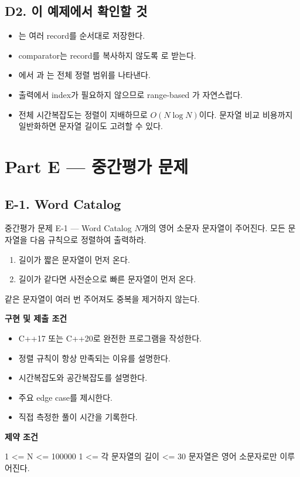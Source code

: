 \subsection{D2. 이 예제에서 확인할 것}
\begin{itemize}
  \item {}는 여러 record를 순서대로 저장한다.
  \item comparator는 record를 복사하지 않도록 로 받는다.
  \item {}에서 과 는 전체 정렬 범위를 나타낸다.
  \item 출력에서 index가 필요하지 않으므로 range-based 가 자연스럽다.
  \item 전체 시간복잡도는 정렬이 지배하므로 $O(N\log N)$이다. 문자열 비교 비용까지 일반화하면 문자열 길이도 고려할 수 있다.
\end{itemize}

\section{Part E --- 중간평가 문제}

\subsection{E-1. Word Catalog}
\begin{problembox}{중간평가 문제 E-1 --- Word Catalog}
$N$개의 영어 소문자 문자열이 주어진다. 모든 문자열을 다음 규칙으로 정렬하여 출력하라.
\begin{enumerate}
  \item 길이가 짧은 문자열이 먼저 온다.
  \item 길이가 같다면 사전순으로 빠른 문자열이 먼저 온다.
\end{enumerate}
같은 문자열이 여러 번 주어져도 중복을 제거하지 않는다.

\textbf{구현 및 제출 조건}
\begin{itemize}
  \item C++17 또는 C++20로 완전한 프로그램을 작성한다.
  \item 정렬 규칙이 항상 만족되는 이유를 설명한다.
  \item 시간복잡도와 공간복잡도를 설명한다.
  \item 주요 edge case를 제시한다.
  \item 직접 측정한 풀이 시간을 기록한다.
\end{itemize}

\textbf{제약 조건}
\begin{TextBlock}
1 <= N <= 100000
1 <= 각 문자열의 길이 <= 30
문자열은 영어 소문자로만 이루어진다.
\end{TextBlock}
\end{problembox}

